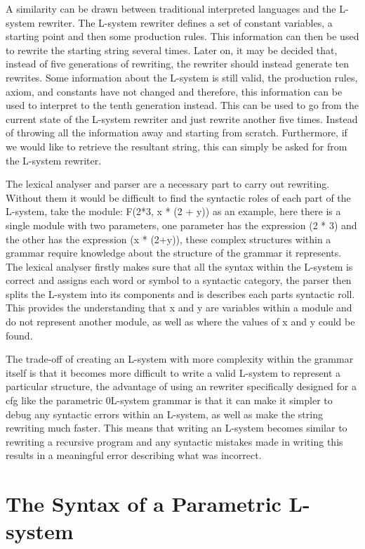 A similarity can be drawn between traditional interpreted languages and the L-system rewriter. The L-system rewriter defines a set of constant variables, a starting point and then some production rules. This information can then be used to rewrite the starting string several times. Later on, it may be decided that, instead of five generations of rewriting, the rewriter should instead generate ten rewrites. Some information about the L-system is still valid, the production rules, axiom, and constants have not changed and therefore, this information can be used to interpret to the tenth generation instead. This can be used to go from the current state of the L-system rewriter and just rewrite another five times. Instead of throwing all the information away and starting from scratch. Furthermore, if we would like to retrieve the resultant string, this can simply be asked for from the L-system rewriter. 

The lexical analyser and parser are a necessary part to carry out rewriting. Without them it would be difficult to find the syntactic roles of each part of the L-system, take the module: F(2*3, x * (2 + y)) as an example, here there is a single module with two parameters, one parameter has the expression (2 * 3) and the other has the expression (x * (2+y)), these complex structures within a grammar require knowledge about the structure of the grammar it represents. The lexical analyser firstly makes sure that all the syntax within the L-system is correct and assigns each word or symbol to a syntactic category, the parser then splits the L-system into its components and is describes each parts syntactic roll. This provides the understanding that x and y are variables within a module and do not represent another module, as well as where the values of x and y could be found. 

The trade-off of creating an L-system with more complexity within the grammar itself is that it becomes more difficult to write a valid L-system to represent a particular structure, the advantage of using an rewriter specifically designed for a \acrshort{cfg} like the parametric 0L-system grammar is that it can make it simpler to debug any syntactic errors within an L-system, as well as make the string rewriting much faster. This means that writing an L-system becomes similar to rewriting a recursive program and any syntactic mistakes made in writing this  results in a meaningful error describing what was incorrect. 

\section{The Syntax of a Parametric L-system}

